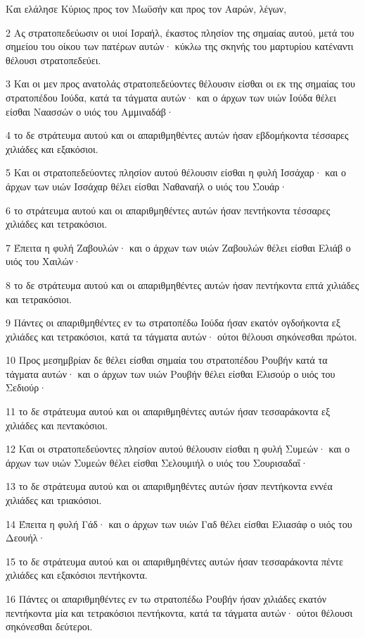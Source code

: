 \par Και ελάλησε Κύριος προς τον Μωϋσήν και προς τον Ααρών, λέγων,
\par 2 Ας στρατοπεδεύωσιν οι υιοί Ισραήλ, έκαστος πλησίον της σημαίας αυτού, μετά του σημείου του οίκου των πατέρων αυτών· κύκλω της σκηνής του μαρτυρίου κατέναντι θέλουσι στρατοπεδεύει.
\par 3 Και οι μεν προς ανατολάς στρατοπεδεύοντες θέλουσιν είσθαι οι εκ της σημαίας του στρατοπέδου Ιούδα, κατά τα τάγματα αυτών· και ο άρχων των υιών Ιούδα θέλει είσθαι Ναασσών ο υιός του Αμμιναδάβ·
\par 4 το δε στράτευμα αυτού και οι απαριθμηθέντες αυτών ήσαν εβδομήκοντα τέσσαρες χιλιάδες και εξακόσιοι.
\par 5 Και οι στρατοπεδεύοντες πλησίον αυτού θέλουσιν είσθαι η φυλή Ισσάχαρ· και ο άρχων των υιών Ισσάχαρ θέλει είσθαι Ναθαναήλ ο υιός του Σουάρ·
\par 6 το στράτευμα αυτού και οι απαριθμηθέντες αυτών ήσαν πεντήκοντα τέσσαρες χιλιάδες και τετρακόσιοι.
\par 7 Έπειτα η φυλή Ζαβουλών· και ο άρχων των υιών Ζαβουλών θέλει είσθαι Ελιάβ ο υιός του Χαιλών·
\par 8 το δε στράτευμα αυτού και οι απαριθμηθέντες αυτών ήσαν πεντήκοντα επτά χιλιάδες και τετρακόσιοι.
\par 9 Πάντες οι απαριθμηθέντες εν τω στρατοπέδω Ιούδα ήσαν εκατόν ογδοήκοντα εξ χιλιάδες και τετρακόσιοι, κατά τα τάγματα αυτών· ούτοι θέλουσι σηκόνεσθαι πρώτοι.
\par 10 Προς μεσημβρίαν δε θέλει είσθαι σημαία του στρατοπέδου Ρουβήν κατά τα τάγματα αυτών· και ο άρχων των υιών Ρουβήν θέλει είσθαι Ελισούρ ο υιός του Σεδιούρ·
\par 11 το δε στράτευμα αυτού και οι απαριθμηθέντες αυτών ήσαν τεσσαράκοντα εξ χιλιάδες και πεντακόσιοι.
\par 12 Και οι στρατοπεδεύοντες πλησίον αυτού θέλουσιν είσθαι η φυλή Συμεών· και ο άρχων των υιών Συμεών θέλει είσθαι Σελουμιήλ ο υιός του Σουρισαδαΐ·
\par 13 το δε στράτευμα αυτού και οι απαριθμηθέντες αυτών ήσαν πεντήκοντα εννέα χιλιάδες και τριακόσιοι.
\par 14 Έπειτα η φυλή Γάδ· και ο άρχων των υιών Γαδ θέλει είσθαι Ελιασάφ ο υιός του Δεουήλ·
\par 15 το δε στράτευμα αυτού και οι απαριθμηθέντες αυτών ήσαν τεσσαράκοντα πέντε χιλιάδες και εξακόσιοι πεντήκοντα.
\par 16 Πάντες οι απαριθμηθέντες εν τω στρατοπέδω Ρουβήν ήσαν χιλιάδες εκατόν πεντήκοντα μία και τετρακόσιοι πεντήκοντα, κατά τα τάγματα αυτών· ούτοι θέλουσι σηκόνεσθαι δεύτεροι.
